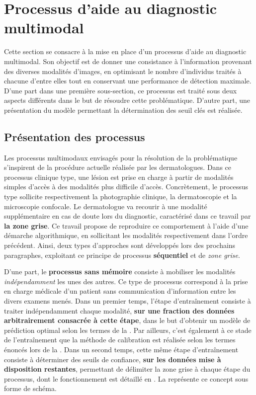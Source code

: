 \section{Processus d'aide au diagnostic multimodal}
Cette section se consacre à la mise en place d'un processus d'aide au diagnostic multimodal. Son objectif est de donner une consistance à l'information provenant des diverses modalités d'images, en optimisant le nombre d'individus traités à chacune d'entre elles tout en conservant une performance de détection maximale. D'une part dans une première sous-section, ce processus est traité sous deux aspects différents dans le but de résoudre cette problématique. D'autre part, une présentation du modèle permettant la détermination des seuil clés est réalisée.

\subsection{Présentation des processus}
Les processus multimodaux envisagés pour la résolution de la problématique s'inspirent de la procédure actuelle réalisée par les dermatologues. Dans ce processus clinique type, une lésion est prise en charge à partir de modalités simples d'accès à des modalités plus difficile d'accès. Concrètement, le processus type sollicite respectivement la photographie clinique, la dermatoscopie et la microscopie confocale. Le dermatologue va recourir à une modalité supplémentaire en cas de doute lors du diagnostic, caractérisé dans ce travail par \textbf{la zone grise}. Ce travail propose de reproduire ce comportement à l'aide d'une démarche algorithmique, en sollicitant les modalités respectivement dans l'ordre précédent. Ainsi, deux types d'approches sont développés lors des prochains paragraphes, exploitant ce principe de processus \textbf{séquentiel} et de \textit{zone grise}.\par

D'une part, le \textbf{processus sans mémoire} consiste à mobiliser les modalités \textit{indépendamment} les unes des autres. Ce type de processus correspond à la prise en charge médicale d'un patient sans communication d'information entre les divers examens menés. Dans un premier temps, l'étape d'entraînement consiste à traiter indépendamment chaque modalité, \textbf{sur une fraction des données arbitrairement consacrée à cette étape}, dans le but d'obtenir un modèle de prédiction optimal selon les termes de la . Par ailleurs, c'est également à ce stade de l'entraînement que la méthode de calibration est réalisée selon les termes énoncés lors de la . Dans un second temps, cette même étape d'entraînement consiste à déterminer des seuils de confiance, \textbf{sur les données mise à disposition restantes}, permettant de délimiter la zone grise à chaque étape du processus, dont le fonctionnement est détaillé en . La  représente ce concept sous forme de schéma.\par

